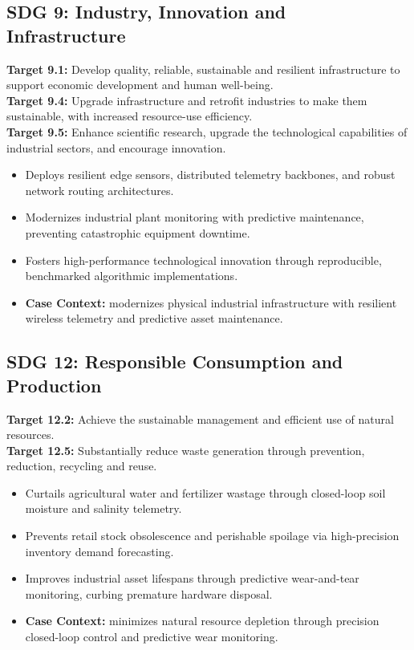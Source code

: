 \subsection{SDG 9: Industry, Innovation and Infrastructure}
\noindent\textbf{Target 9.1:} Develop quality, reliable, sustainable and resilient infrastructure to support economic development and human well-being. \\
\noindent\textbf{Target 9.4:} Upgrade infrastructure and retrofit industries to make them sustainable, with increased resource-use efficiency. \\
\noindent\textbf{Target 9.5:} Enhance scientific research, upgrade the technological capabilities of industrial sectors, and encourage innovation.
\begin{itemize}
  \item Deploys resilient edge sensors, distributed telemetry backbones, and robust network routing architectures.
  \item Modernizes industrial plant monitoring with predictive maintenance, preventing catastrophic equipment downtime.
  \item Fosters high-performance technological innovation through reproducible, benchmarked algorithmic implementations.
  \item \textbf{Case Context:} modernizes physical industrial infrastructure with resilient wireless telemetry and predictive asset maintenance.
\end{itemize}

\subsection{SDG 12: Responsible Consumption and Production}
\noindent\textbf{Target 12.2:} Achieve the sustainable management and efficient use of natural resources. \\
\noindent\textbf{Target 12.5:} Substantially reduce waste generation through prevention, reduction, recycling and reuse.
\begin{itemize}
  \item Curtails agricultural water and fertilizer wastage through closed-loop soil moisture and salinity telemetry.
  \item Prevents retail stock obsolescence and perishable spoilage via high-precision inventory demand forecasting.
  \item Improves industrial asset lifespans through predictive wear-and-tear monitoring, curbing premature hardware disposal.
  \item \textbf{Case Context:} minimizes natural resource depletion through precision closed-loop control and predictive wear monitoring.
\end{itemize}

